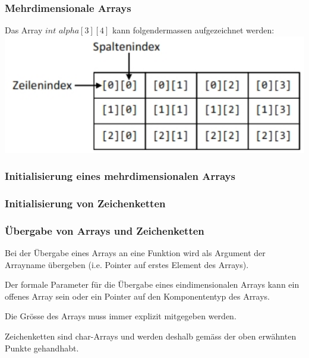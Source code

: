 		\begin{minipage}[t]{9 cm}	
			\subsubsection{Mehrdimensionale Arrays }
				Das Array $int$ $alpha[3][4]$ kann folgendermassen aufgezeichnet werden: \\
				\includegraphics[width=1\textwidth]{pics/array_mehrdimensional.jpg}
			
			\subsubsection{Initialisierung eines mehrdimensionalen Arrays }
				
		\end{minipage}

		\subsubsection{Initialisierung von Zeichenketten }
			
			
		\subsubsection{Übergabe von Arrays und Zeichenketten }
			\begin{compactitem}
				\item Bei der Übergabe eines Arrays an eine Funktion wird als Argument der Arrayname übergeben (i.e. Pointer auf erstes Element des Arrays).
				\item Der formale Parameter für die Übergabe eines eindimensionalen Arrays kann ein offenes Array sein oder ein Pointer auf den Komponententyp des Arrays.
				\item Die Grösse des Arrays muss immer explizit mitgegeben werden.
				\item Zeichenketten sind char-Arrays und werden deshalb gemäss der oben erwähnten Punkte gehandhabt.
			\end{compactitem}
			
			
